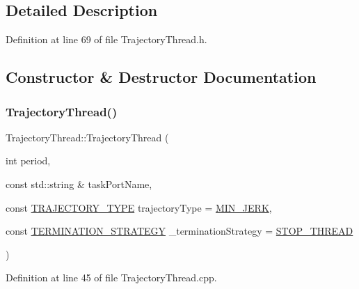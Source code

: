 \subsection{Detailed Description}


Definition at line 69 of file Trajectory\+Thread.\+h.



\subsection{Constructor \& Destructor Documentation}
\hypertarget{classocra__recipes_1_1TrajectoryThread_af85d199a74007110a7654a06f9d3b172}{}\label{classocra__recipes_1_1TrajectoryThread_af85d199a74007110a7654a06f9d3b172} 
\subsubsection{\texorpdfstring{Trajectory\+Thread()}{TrajectoryThread()}\hspace{0.1cm}{\footnotesize\ttfamily [1/3]}}
{\footnotesize\ttfamily Trajectory\+Thread\+::\+Trajectory\+Thread (\begin{DoxyParamCaption}\item[{int}]{period,  }\item[{const std\+::string \&}]{task\+Port\+Name,  }\item[{const \hyperlink{namespaceocra__recipes_a729e1c8304e390d16219eda5f9756152}{T\+R\+A\+J\+E\+C\+T\+O\+R\+Y\+\_\+\+T\+Y\+PE}}]{trajectory\+Type = {\ttfamily \hyperlink{namespaceocra__recipes_a729e1c8304e390d16219eda5f9756152ad90eb95c7a6e37072c38d0f83980bff7}{M\+I\+N\+\_\+\+J\+E\+RK}},  }\item[{const \hyperlink{namespaceocra__recipes_afcf7ca623a6c39b246aa4bda629c7309}{T\+E\+R\+M\+I\+N\+A\+T\+I\+O\+N\+\_\+\+S\+T\+R\+A\+T\+E\+GY}}]{\+\_\+termination\+Strategy = {\ttfamily \hyperlink{namespaceocra__recipes_afcf7ca623a6c39b246aa4bda629c7309a0dc02a3e20f98a401113c91d7e6d4528}{S\+T\+O\+P\+\_\+\+T\+H\+R\+E\+AD}} }\end{DoxyParamCaption})}



Definition at line 45 of file Trajectory\+Thread.\+cpp.

\hypertarget{classocra__recipes_1_1TrajectoryThread_af4c3060ff7bf481ea13b5c81247681d4}{}\label{classocra__recipes_1_1TrajectoryThread_af4c3060ff7bf481ea13b5c81247681d4} 
